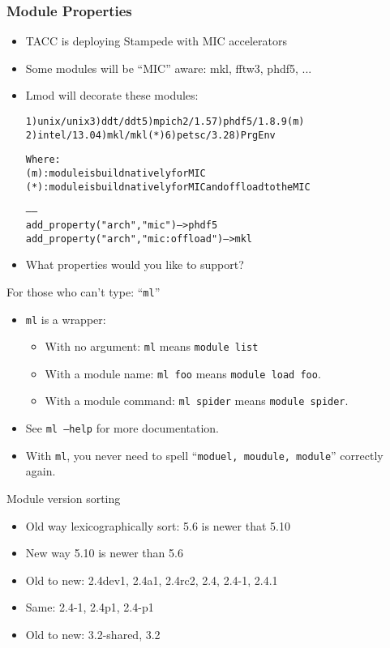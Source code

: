\documentclass{beamer}
\begin{document}
\begin{frame}[fragile]
    \frametitle{Module Properties}
  \begin{itemize}
    \item TACC is deploying Stampede with MIC accelerators
    \item Some modules will be ``MIC'' aware: mkl, fftw3, phdf5, ...
    \item Lmod will decorate these modules:
  {\tiny
    \begin{alltt}
  1) unix/unix     3) ddt/ddt       5) mpich2/1.5    7) {\color{blue}phdf5/1.8.9 (m)}
  2) intel/13.0    4) {\color{red}mkl/mkl (*)}   6) petsc/3.2     8) PrgEnv

  Where:
   {\color{blue}(m)}:  module is build natively for MIC
   {\color{red}(*)}:  module is build natively for MIC and offload to the MIC

   ------
   add_property("arch","mic")              -- > phdf5
   add_property("arch","mic:offload")      -- > mkl
    \end{alltt}
}
  \item What properties would you like to support?
  \end{itemize}
\end{frame}


\begin{frame}{For those who can't type: ``\texttt{ml}''}
  \begin{itemize}
    \item \texttt{ml} is a wrapper:
      \begin{itemize}
        \item With no argument: \texttt{ml} means \texttt{module list}
        \item With a module name: \texttt{ml foo} means \texttt{module
            load foo}.
        \item With a module command: \texttt{ml spider} means
          \texttt{module spider}.
      \end{itemize}
    \item See \texttt{ml --help} for more documentation.
    \item With \texttt{ml}, you never need to spell ``\texttt{moduel, moudule, module}''
      correctly again.
  \end{itemize}
\end{frame}

\begin{frame}{Module version sorting}
  \begin{itemize}
    \item Old way lexicographically sort: 5.6 is newer that 5.10
    \item New way 5.10 is newer than 5.6
    \item Old to new: 2.4dev1, 2.4a1, 2.4rc2, 2.4, 2.4-1, 2.4.1
    \item Same: 2.4-1, 2.4p1, 2.4-p1
    \item Old to new: 3.2-shared, 3.2
  \end{itemize}
\end{frame}
\end{document}
